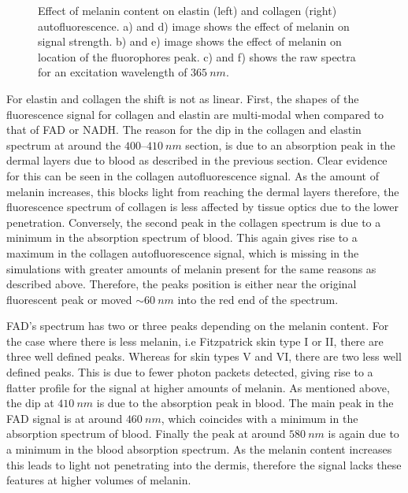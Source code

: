\begin{figure}[!htbp]
    \centering
    \caption{Effect of melanin content on elastin (left) and collagen (right) autofluorescence. a) and d) image shows the effect of melanin on signal strength. b) and e) image shows the effect of melanin on location of the fluorophores peak. c) and f) shows the raw spectra for an excitation wavelength of $365~nm$.}%
    \label{fig:elscol-mel}%
\end{figure}

For elastin and collagen the shift is not as linear.
First, the shapes of the fluorescence signal for collagen and elastin are multi-modal when compared to that of FAD or NADH\@.
The reason for the dip in the collagen and elastin spectrum at around the $400$--$410~nm$ section, is due to an absorption peak in the dermal layers due to blood as described in the previous section.
Clear evidence for this can be seen in the collagen autofluorescence signal.
As the amount of melanin increases, this blocks light from reaching the dermal layers therefore, the fluorescence spectrum of collagen is less affected by tissue optics due to the lower penetration.
Conversely, the second peak in the collagen spectrum is due to a minimum in the absorption spectrum of blood.
This again gives rise to a maximum in the collagen autofluorescence signal, which is missing in the simulations with greater amounts of melanin present for the same reasons as described above.
Therefore, the peaks position is either near the original fluorescent peak or moved $\sim 60~nm$ into the red end of the spectrum.

FAD's spectrum has two or three peaks depending on the melanin content.
For the case where there is less melanin, i.e Fitzpatrick skin type I or II, there are three well defined peaks.
Whereas for skin types V and VI, there are two less well defined peaks.
This is due to fewer photon packets detected, giving rise to a flatter profile for the signal at higher amounts of melanin.
As mentioned above, the dip at $410~nm$ is due to the absorption peak in blood. 
The main peak in the FAD signal is at around $460~nm$, which coincides with a minimum in the absorption spectrum of blood.
Finally the peak at around $580~nm$ is again due to a minimum in the blood absorption spectrum.
As the melanin content increases this leads to light not penetrating into the dermis, therefore the signal lacks these features at higher volumes of melanin.

